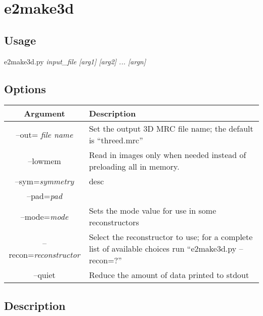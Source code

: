 \section{e2make3d}  \label{E2MAKE3D}

\subsection{Usage}
e2make3d.py \it{input\_file [arg1] [arg2] ... [argn]} \\ 

\subsection{Options}
\begin{tabular}{|c||p{3.5in}|}
  \hline \bf{Argument} & \bf{Description} \\
  \hline --out= \it{file name} 
    & Set the output 3D MRC file name; the default is ``threed.mrc''\\
  \hline --lowmem 
    & Read in images only when needed instead of preloading all in memory.\\
  \hline --sym=\it{symmetry} 
    & desc\\
  \hline --pad=\it{pad} 
    & \\
  \hline --mode=\it{mode} 
    & Sets the mode value for use in some reconstructors\\
  \hline --recon=\it{reconstructor} 
    & Select the reconstructor to use; for a complete list of
  available choices run ``e2make3d.py --recon=?''\\
  \hline --quiet 
    & Reduce the amount of data printed to stdout\\
  \hline

\end{tabular}

\subsection{Description}
